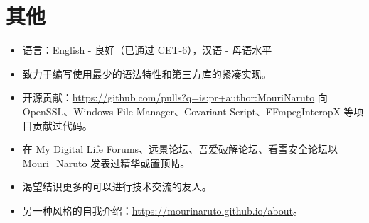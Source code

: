 \documentclass{resume}
\begin{document}
\section{其他}
\begin{itemize}

  \item 语言：English - 良好（已通过 CET-6），汉语 - 母语水平

  \item 致力于编写使用最少的语法特性和第三方库的紧凑实现。

  \item 开源贡献：\href{https://github.com/pulls?q=is:pr+author:MouriNaruto}{https://github.com/pulls?q=is:pr+author:MouriNaruto} 向 OpenSSL、Windows File Manager、Covariant Script、FFmpegInteropX 等项目贡献过代码。
  
  \item 在 My Digital Life Forums、远景论坛、吾爱破解论坛、看雪安全论坛以 Mouri\_Naruto 发表过精华或置顶帖。
  
  \item 渴望结识更多的可以进行技术交流的友人。

  \item 另一种风格的自我介绍：\href{https://mourinaruto.github.io/about}{https://mourinaruto.github.io/about}。
  
\end{itemize}
\end{document}
